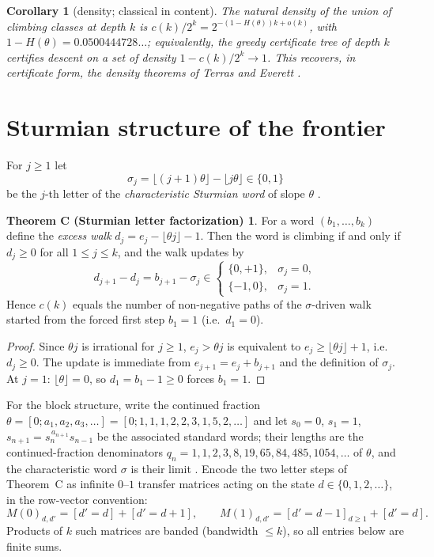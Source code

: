 \documentclass[11pt]{article}
\newtheorem{corollary}[theorem]{Corollary}
\theoremstyle{definition}
\newtheorem*{thmC}{Theorem C (Sturmian letter factorization)}
\newcommand{\floor}[1]{\lfloor #1\rfloor}
\begin{document}
\begin{corollary}[density; classical in content]\label{cor:density}
The natural density of the union of climbing classes at depth $k$ is
$c(k)/2^k=2^{-(1-H(\theta))k+o(k)}$, with $1-H(\theta)=0.0500444728\ldots$;
equivalently, the greedy certificate tree of depth $k$ certifies descent on
a set of density $1-c(k)/2^k\to 1$. This recovers, in certificate form, the
density theorems of Terras and Everett
\cite{Terras1976,Everett1977,Korec1994}.
\end{corollary}

\section{Sturmian structure of the frontier}\label{sec:sturmian}

For $j\ge 1$ let
\[
\sigma_j=\floor{(j+1)\theta}-\floor{j\theta}\in\{0,1\}
\]
be the $j$-th letter of the \emph{characteristic Sturmian word} of slope
$\theta$ \cite[Ch.~2]{Lothaire2002}.

\begin{thmC}
For a word $(b_1,\dots,b_k)$ define the \emph{excess walk}
$d_j=e_j-\floor{\theta j}-1$. Then the word is climbing if and only if
$d_j\ge 0$ for all $1\le j\le k$, and the walk updates by
\[
d_{j+1}-d_j=b_{j+1}-\sigma_j\in
\begin{cases}
\{0,+1\}, & \sigma_j=0,\\
\{-1,0\}, & \sigma_j=1 .
\end{cases}
\]
Hence $c(k)$ equals the number of non-negative paths of the
$\sigma$-driven walk started from the forced first step $b_1=1$
(i.e.\ $d_1=0$).
\end{thmC}

\begin{proof}
Since $\theta j$ is irrational for $j \geq 1$, $e_j>\theta j$ is equivalent to
$e_j\ge\floor{\theta j}+1$, i.e.\ $d_j\ge 0$. The update is immediate from
$e_{j+1}=e_j+b_{j+1}$ and the definition of $\sigma_j$. At $j=1$:
$\floor{\theta}=0$, so $d_1=b_1-1\ge 0$ forces $b_1=1$.
\end{proof}

For the block structure, write the continued fraction
$\theta=[0;a_1,a_2,a_3,\dots]=[0;1,1,1,2,2,3,1,5,2,\dots]$ and let
$s_0=0$, $s_1=1$, $s_{n+1}=s_n^{\,a_{n+1}}s_{n-1}$ be the associated
standard words; their lengths are the continued-fraction denominators
$q_n=1,1,2,3,8,19,65,84,485,1054,\dots$ of $\theta$, and the
characteristic word $\sigma$ is their limit \cite[Ch.~2]{Lothaire2002}.
Encode the two letter steps of Theorem~C as infinite $0$--$1$ transfer
matrices acting on the state $d\in\{0,1,2,\dots\}$, in the row-vector
convention:
\[
M(0)_{d,d'}=[d'=d]+[d'=d+1],\qquad
M(1)_{d,d'}=[d'=d-1]_{d\ge1}+[d'=d] .
\]
Products of $k$ such matrices are banded (bandwidth $\le k$), so all
entries below are finite sums.
\end{document}
